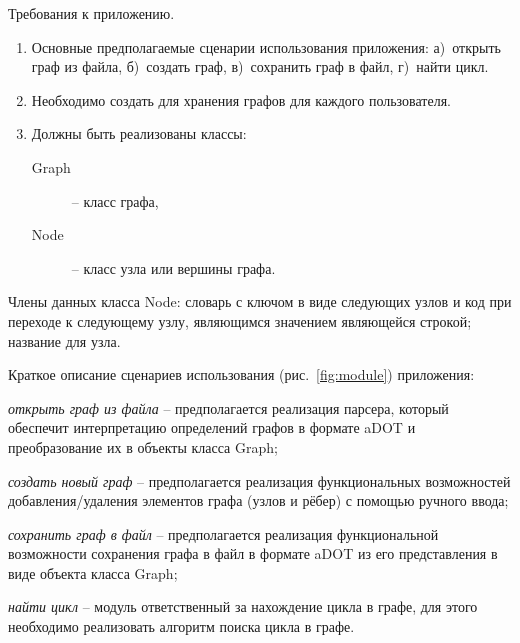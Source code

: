 \def\notedate{2023.01.25}
\def\currentauthor{Журавлев Н.В. (РК6-72Б)}


Требования к приложению.
\begin{enumerate}
  \item Основные предполагаемые сценарии использования приложения: а)~открыть граф из файла, б)~создать граф, в)~сохранить граф в файл, г)~найти цикл.
  \item Необходимо создать  для хранения графов для каждого пользователя.
  \item Должны быть реализованы классы:
  \begin{description}
     \item[Graph] -- класс графа,
     \item[Node] -- класс узла или вершины графа.
   \end{description}
\end{enumerate}

Члены данных класса \textsf{Node}: словарь с ключом в виде следующих узлов и код при переходе к следующему узлу, являющимся значением являющейся строкой; название для узла.

Краткое описание сценариев использования (рис.~\ref{fig:module}) приложения:
\begin{description}
\item \textit{открыть граф из файла} -- предполагается реализация парсера, который обеспечит интерпретацию определений графов в формате \gls{aDOT} и преобразование их в объекты класса \textsf{Graph};
\item \textit{создать новый граф} -- предполагается реализация функциональных возможностей добавления/удаления элементов графа (узлов и рёбер) с помощью ручного ввода;
\item \textit{сохранить граф в файл} -- предполагается реализация функциональной возможности сохранения графа в файл в формате \gls{aDOT} из его представления в виде объекта класса \textsf{Graph};
\item \textit{найти цикл} -- модуль ответственный за нахождение цикла в графе, для этого необходимо реализовать алгоритм поиска цикла в графе.
\end{description}

